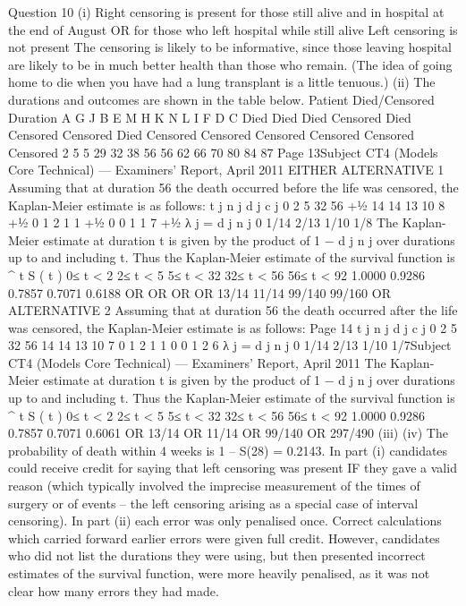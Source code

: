 \documentclass[a4paper,12pt]{article}
\begin{document}
\begin{enumerate}
Question 10
(i)
Right censoring is present
for those still alive and in hospital at the end of August
OR
for those who left hospital while still alive
Left censoring is not present
The censoring is likely to be informative, since those leaving hospital are
likely to be in much better health than those who remain. (The idea of going home to
die when you have had a lung transplant is a little tenuous.)
(ii)
The durations and outcomes are shown in the table below.
Patient Died/Censored Duration
A
G
J
B
E
M
H
K
N
L
I
F
D
C Died
Died
Died
Censored
Died
Censored
Censored
Died
Censored
Censored
Censored
Censored
Censored
Censored 2
5
5
29
32
38
56
56
62
66
70
80
84
87
Page 13Subject CT4 (Models Core Technical) — Examiners’ Report, April 2011
EITHER ALTERNATIVE 1
Assuming that at duration 56 the death occurred before the life was censored, the
Kaplan-Meier estimate is as follows:
t j n j d j c j
0
2
5
32
56
+1⁄2 14
14
13
10
8
+1⁄2 0
1
2
1
1
+1⁄2 0
0
1
1
7
+1⁄2
λ j =
d j
n j
0
1/14
2/13
1/10
1/8
The Kaplan-Meier estimate at duration t is given by the product of 1 −
d j
n j
over
durations up to and including t. Thus the Kaplan-Meier estimate of the survival
function is
^
t S ( t )
0≤ t < 2
2≤ t < 5
5≤ t < 32
32≤ t < 56
56≤ t < 92 1.0000
0.9286
0.7857
0.7071
0.6188
OR
OR
OR
OR
13/14
11/14
99/140
99/160
OR ALTERNATIVE 2
Assuming that at duration 56 the death occurred after the life was
censored, the Kaplan-Meier estimate is as follows:
Page 14
t j n j d j c j
0
2
5
32
56 14
14
13
10
7 0
1
2
1
1 0
0
1
2
6
λ j =
d j
n j
0
1/14
2/13
1/10
1/7Subject CT4 (Models Core Technical) — Examiners’ Report, April 2011
The Kaplan-Meier estimate at duration t is given by the product of 1 −
d j
n j
over
durations up to and including t. Thus the Kaplan-Meier estimate of the survival
function is
^
t S ( t )
0≤ t < 2
2≤ t < 5
5≤ t < 32
32≤ t < 56
56≤ t < 92 1.0000
0.9286
0.7857
0.7071
0.6061
OR 13/14
OR 11/14
OR 99/140
OR 297/490
(iii)
(iv)
The probability of death within 4 weeks is 1 – S(28) = 0.2143.
In part (i) candidates could receive credit for saying that left censoring was present IF they
gave a valid reason (which typically involved the imprecise measurement of the times of
surgery or of events – the left censoring arising as a special case of interval censoring).
In part (ii) each error was only penalised once. Correct calculations which carried forward
earlier errors were given full credit. However, candidates who did not list the durations they
were using, but then presented incorrect estimates of the survival function, were more heavily
penalised, as it was not clear how many errors they had made.

\end{enumerate}
\end{document}
